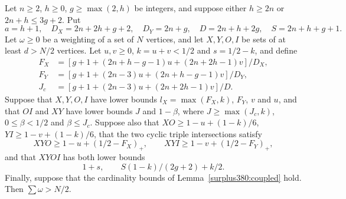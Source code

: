 \begin{lemma}
\label{gap394:canonical-inputs}
Let $n\ge2$, $h\ge0$, $g\ge\max(2,h)$ be integers, and suppose either
$h\ge2n$ or $2n+h\le3g+2$. Put
\[
 a=h+1,\quad D_X=2n+2h+g+2,\quad D_Y=2n+g,
 \quad D=2n+h+2g,\quad S=2n+h+g+1.
\]
Let $\omega\ge0$ be a weighting of a set of $N$ vertices, and let $X,Y,O,I$ be sets of at least $d>N/2$ vertices. Let
$u,v\ge0$, $k=u+v<1/2$ and $s=1/2-k$, and define
\[
\begin{split}
 F_X&=[g+1+(2n+h-g-1)u+(2n+2h-1)v]/D_X,\\
 F_Y&=[g+1+(2n-3)u+(2n+h-g-1)v]/D_Y,\\
 J_c&=[g+1+(2n-3)u+(2n+2h-1)v]/D.
\end{split}
\]
Suppose that $X,Y,O,I$ have lower bounds
$l_X=\max(F_X,k)$, $F_Y$, $v$ and $u$, and that $OI$ and $XY$ have lower bounds
$J$ and $1-\beta$, where $J\ge\max(J_c,k)$,
$0\le\beta<1/2$ and $\beta\le J_c$.
Suppose also that $XO\ge1-u+(1-k)/6$, $YI\ge1-v+(1-k)/6$, that the two cyclic triple
intersections satisfy
\[
 XYO\ge1-u+(1/2-F_X)_+,\qquad
 XYI\ge1-v+(1/2-F_Y)_+,
\]
and that $XYOI$ has both lower bounds
\[
             1+s,\qquad S(1-k)/(2g+2)+k/2.
\]
Finally, suppose that the cardinality bounds of Lemma~\ref{surplus380:coupled} hold. Then
$\sum\omega>N/2$.
\end{lemma}
